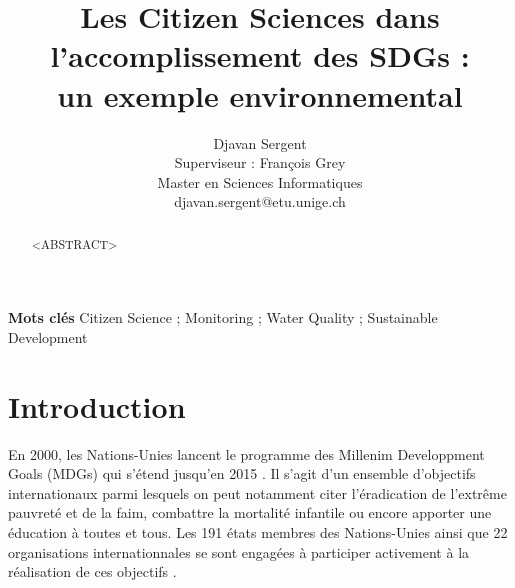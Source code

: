 \documentclass[10pt, article]{llncs}
\begin{document}
%
\title{Les Citizen Sciences dans\\l'accomplissement des SDGs : \\un exemple environnemental}



% 
\author{Djavan Sergent \\
Superviseur : François Grey\\
Master en Sciences Informatiques \\
djavan.sergent@etu.unige.ch}




\maketitle

\begin{abstract}
	<ABSTRACT>
\end{abstract}


\textbf{Mots clés} Citizen Science ; Monitoring ; Water Quality ; Sustainable Development

\pagebreak

\section{Introduction}
	En 2000, les Nations-Unies lancent le programme des Millenim Developpment Goals (MDGs) qui s'étend jusqu'en 2015 \cite{united_nations_millennium_2009}. Il s'agit d'un ensemble d'objectifs internationaux parmi lesquels on peut notamment citer l'éradication de l'extrême pauvreté et de la faim, combattre la mortalité infantile ou encore apporter une éducation à toutes et tous. Les 191 états membres des Nations-Unies ainsi que 22 organisations internationnales se sont engagées à participer activement à la réalisation de ces objectifs \cite{wikipedia_millennium_2017}.
	
\end{document}
